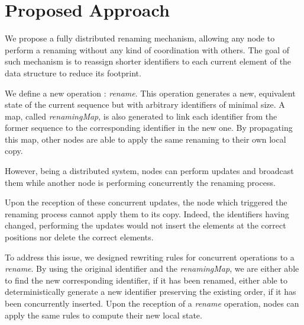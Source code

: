 \documentclass[sigplan]{acmart}
\begin{document}
\section{Proposed Approach}


We propose a fully distributed renaming mechanism, allowing any node to perform a renaming without any kind of coordination with others.
The goal of such mechanism is to reassign shorter identifiers to each current element of the data structure to reduce its footprint.

We define a new operation : \emph{rename}.
This operation generates a new, equivalent state of the current sequence but with arbitrary identifiers of minimal size.
A map, called \emph{renamingMap}, is also generated to link each identifier from the former sequence to the corresponding identifier in the new one.
By propagating this map, other nodes are able to apply the same renaming to their own local copy.

However, being a distributed system, nodes can perform updates and broadcast them while another node is performing concurrently the renaming process.

Upon the reception of these concurrent updates, the node which triggered the renaming process cannot apply them to its copy.
Indeed, the identifiers having changed, performing the updates would not insert the elements at the correct positions nor delete the correct elements.

To address this issue, we designed rewriting rules for concurrent operations to a \emph{rename}.
By using the original identifier and the \emph{renamingMap}, we are either able to find the new corresponding identifier, if it has been renamed, either able to deterministically generate a new identifier preserving the existing order, if it has been concurrently inserted.
Upon the reception of a \emph{rename} operation, nodes can apply the same rules to compute their new local state.
\end{document}
